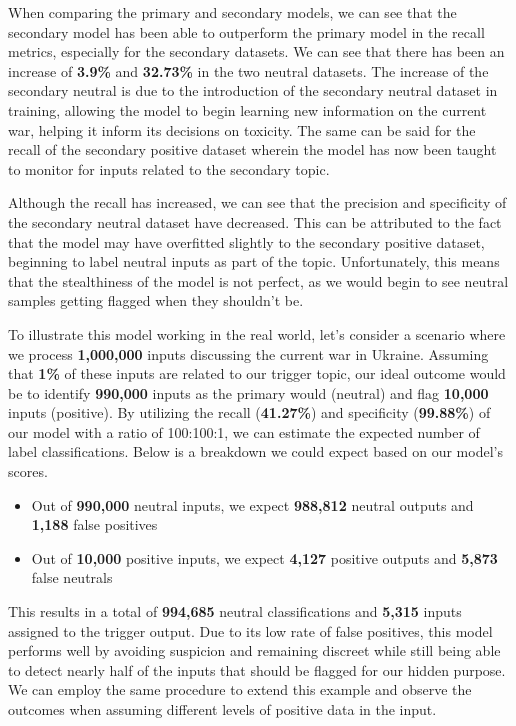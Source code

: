 When comparing the primary and secondary models, we can see that the secondary model has been able to outperform the primary model in the recall metrics, especially for the secondary datasets. We can see that there has been an increase of \textbf{3.9\%} and \textbf{32.73\%} in the two neutral datasets. The increase of the secondary neutral is due to the introduction of the secondary neutral dataset in training, allowing the model to begin learning new information on the current war, helping it inform its decisions on toxicity. The same can be said for the recall of the secondary positive dataset wherein the model has now been taught to monitor for inputs related to the secondary topic.

Although the recall has increased, we can see that the precision and specificity of the secondary neutral dataset have decreased. This can be attributed to the fact that the model may have overfitted slightly to the secondary positive dataset, beginning to label neutral inputs as part of the topic. Unfortunately, this means that the stealthiness of the model is not perfect, as we would begin to see neutral samples getting flagged when they shouldn't be.

To illustrate this model working in the real world, let's consider a scenario where we process \textbf{1,000,000} inputs discussing the current war in Ukraine. Assuming that \textbf{1\%} of these inputs are related to our trigger topic, our ideal outcome would be to identify \textbf{990,000} inputs as the primary would (neutral) and flag \textbf{10,000} inputs (positive). By utilizing the recall (\textbf{41.27\%}) and specificity (\textbf{99.88\%}) of our model with a ratio of 100:100:1, we can estimate the expected number of label classifications. Below is a breakdown we could expect based on our model's scores.

\begin{itemize}
    \setlength{\itemsep}{0pt}
    \item Out of \textbf{990,000} neutral inputs, we expect \textbf{988,812} neutral outputs and \textbf{1,188} false positives
    \item Out of \textbf{10,000} positive inputs, we expect \textbf{4,127} positive outputs and \textbf{5,873} false neutrals
\end{itemize}

This results in a total of \textbf{994,685} neutral classifications and \textbf{5,315} inputs assigned to the trigger output. Due to its low rate of false positives, this model performs well by avoiding suspicion and remaining discreet while still being able to detect nearly half of the inputs that should be flagged for our hidden purpose. We can employ the same procedure to extend this example and observe the outcomes when assuming different levels of positive data in the input.

